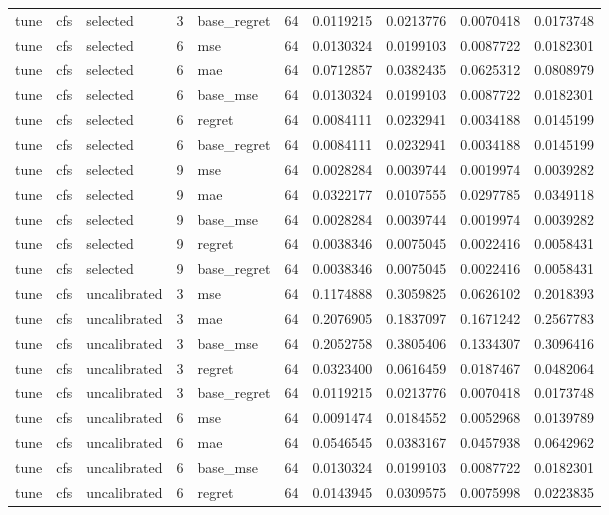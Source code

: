 \begin{tabular}{lllrlrrrrr}
tune & cfs & selected & 3 & base_regret & 64 & 0.0119215 & 0.0213776 & 0.0070418 & 0.0173748 \\
tune & cfs & selected & 6 & mse & 64 & 0.0130324 & 0.0199103 & 0.0087722 & 0.0182301 \\
tune & cfs & selected & 6 & mae & 64 & 0.0712857 & 0.0382435 & 0.0625312 & 0.0808979 \\
tune & cfs & selected & 6 & base_mse & 64 & 0.0130324 & 0.0199103 & 0.0087722 & 0.0182301 \\
tune & cfs & selected & 6 & regret & 64 & 0.0084111 & 0.0232941 & 0.0034188 & 0.0145199 \\
tune & cfs & selected & 6 & base_regret & 64 & 0.0084111 & 0.0232941 & 0.0034188 & 0.0145199 \\
tune & cfs & selected & 9 & mse & 64 & 0.0028284 & 0.0039744 & 0.0019974 & 0.0039282 \\
tune & cfs & selected & 9 & mae & 64 & 0.0322177 & 0.0107555 & 0.0297785 & 0.0349118 \\
tune & cfs & selected & 9 & base_mse & 64 & 0.0028284 & 0.0039744 & 0.0019974 & 0.0039282 \\
tune & cfs & selected & 9 & regret & 64 & 0.0038346 & 0.0075045 & 0.0022416 & 0.0058431 \\
tune & cfs & selected & 9 & base_regret & 64 & 0.0038346 & 0.0075045 & 0.0022416 & 0.0058431 \\
tune & cfs & uncalibrated & 3 & mse & 64 & 0.1174888 & 0.3059825 & 0.0626102 & 0.2018393 \\
tune & cfs & uncalibrated & 3 & mae & 64 & 0.2076905 & 0.1837097 & 0.1671242 & 0.2567783 \\
tune & cfs & uncalibrated & 3 & base_mse & 64 & 0.2052758 & 0.3805406 & 0.1334307 & 0.3096416 \\
tune & cfs & uncalibrated & 3 & regret & 64 & 0.0323400 & 0.0616459 & 0.0187467 & 0.0482064 \\
tune & cfs & uncalibrated & 3 & base_regret & 64 & 0.0119215 & 0.0213776 & 0.0070418 & 0.0173748 \\
tune & cfs & uncalibrated & 6 & mse & 64 & 0.0091474 & 0.0184552 & 0.0052968 & 0.0139789 \\
tune & cfs & uncalibrated & 6 & mae & 64 & 0.0546545 & 0.0383167 & 0.0457938 & 0.0642962 \\
tune & cfs & uncalibrated & 6 & base_mse & 64 & 0.0130324 & 0.0199103 & 0.0087722 & 0.0182301 \\
tune & cfs & uncalibrated & 6 & regret & 64 & 0.0143945 & 0.0309575 & 0.0075998 & 0.0223835 \\

\end{tabular}
